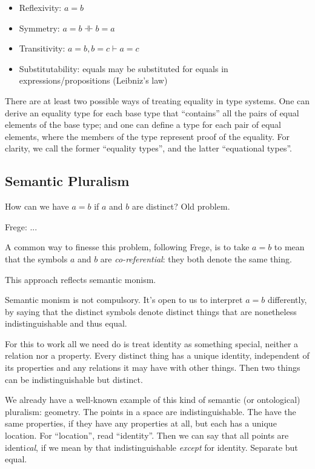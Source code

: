 \documentclass{article}
\begin{document}
\begin{itemize}
\item Reflexivity: \(a=b\)
\item Symmetry: \(a=b \dashVdash b=a\)
\item Transitivity: \(a=b, b=c \vdash a=c\)
\item Substitutability: equals may be substituted for equals in
  expressions/propositions (Leibniz's law)
\end{itemize}


There are at least two possible ways of treating equality in type
systems. One can derive an equality type for each base type that
``contains'' all the pairs of equal elements of the base type; and one
can define a type for each pair of equal elements, where the members
of the type represent proof of the equality. For clarity, we call the
former ``equality types'', and the latter ``equational types''.

\subsection{Semantic Pluralism}

How can we have \(a=b\) if \(a\) and \(b\) are distinct?  Old problem.

Frege: ...

A common way to finesse this problem, following Frege, is to take
\(a=b\) to mean that the symbols \(a\) and \(b\) are
\textit{co-referential}: they both denote the same thing.

This approach reflects semantic monism.

Semantic monism is not compulsory. It's open to us to interpret
\(a=b\) differently, by saying that the distinct symbols denote
distinct things that are nonetheless indistinguishable and thus equal.

For this to work all we need do is treat identity as something
special, neither a relation nor a property. Every distinct thing has a
unique identity, independent of its properties and any relations it
may have with other things. Then two things can be indistinguishable
but distinct.

We already have a well-known example of this kind of semantic (or
ontological) pluralism: geometry. The points in a space are
indistinguishable. The have the same properties, if they have any
properties at all, but each has a unique location. For ``location'',
read ``identity''. Then we can say that all points are
identi\textit{cal}, if we mean by that indistinguishable
\textit{except} for identity.  Separate but equal.
\end{document}
